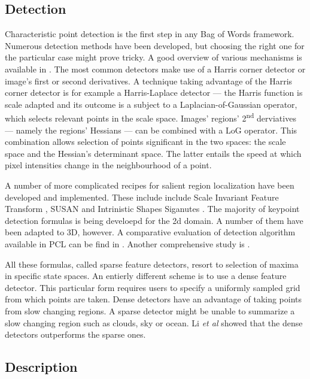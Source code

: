 \documentclass[a4paper,12pt]{article}
\begin{document}
\subsection{Detection}

	Characteristic point detection is the first step in any Bag of Words framework. Numerous detection methods have been developed, but choosing the right one for the particular case might prove tricky. A good overview of various mechanisms is available in \cite{tsai2012bag}. The most common detectors make use of a Harris corner detector or image's first or second derivatives. A technique taking advantage of the Harris corner detector is for example a Harris-Laplace detector --- the Harris function is scale adapted and its outcome is a subject to a Laplacian-of-Gaussian operator, which selects relevant points in the scale space. Images' regions' 2\textsuperscript{nd} derviatives --- namely the regions' Hessians --- can be combined with a LoG operator. This combination allows selection of points significant in the two spaces: the scale space and the Hessian's determinant space. The latter entails the speed at which pixel intensities change in the neighbourhood of a point.	
	
	A number of more complicated recipes for salient region localization have been developed and implemented. These include include Scale Invariant Feature Transform \cite{sift_keypoint}, SUSAN \cite{susan_keypoint} and Intrinistic Shapes Siganutes \cite{iss_keypoint}. The majority of keypoint detection formulas is being develoepd for the 2d domain. A number of them have been adapted to 3D, however. A comparative evaluation of detection algorithm available in PCL can be find in \cite{pcl_keypoint_comparision}. Another comprehensive study is \cite{3d_keypoint_eval}.
	
	All these formulas, called sparse feature detectors, resort to selection of maxima in specific state spaces. An entierly different scheme is to use a dense feature detector. This particular form requires users to specify a uniformly sampled grid from which points are taken. Dense detectors have an advantage of taking points from slow changing regions. A sparse detector might be unable to summarize a slow changing region such as clouds, sky or ocean. Li \emph{et al} showed that the dense detectors outperforms the sparse ones.
	
	
	
\subsection{Description}
\end{document}
